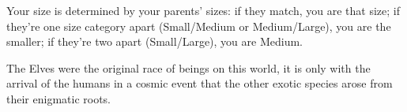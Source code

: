Your size is determined by your parents' sizes: if they match, you are that size; if they're one size category apart (Small/Medium or Medium/Large), you are the smaller; if they're two apart (Small/Large), you are Medium.

\begin{DndReadAloud}
   The Elves were the original race of beings on this world, it is only with the arrival of the humans in a cosmic event that the other exotic species arose from their enigmatic roots.
\end{DndReadAloud}

\newpage
